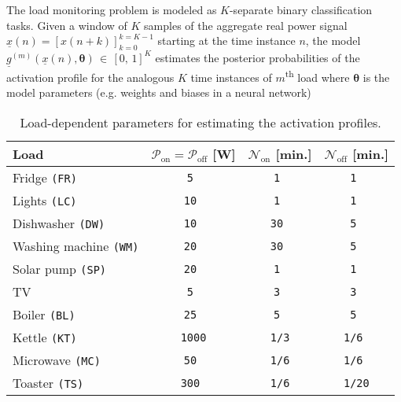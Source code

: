 \documentclass[twocolumn,letter,10pt]{IEEEtran} %
\begin{document}
The load monitoring problem is modeled as $K$-separate binary classification tasks. Given a window of $K$ samples of the aggregate real power signal $\underline{x}(n) = \left[x(n + k)\right]_{k=0}^{k=K-1}$ starting at the time instance $n$, the model $\underline{g}^{(m)}(\underline{x}(n), \bm{\theta})\,\in\,[0,\,1]^K$ estimates the posterior probabilities of the activation profile for the analogous $K$ time instances of $m$\textsuperscript{th} load where $\bm{\theta}$ is the model parameters (e.g. weights and biases in a neural network)

\setlength{\textfloatsep}{0.1cm}
\begin{table}[!t]
	\centering
	\footnotesize
	\caption{Load-dependent parameters for estimating the activation profiles. }
	\label{tbl:loads}
	\renewcommand{\arraystretch}{0.81}
	\footnotesize
	\begin{tabularx}{88mm}{lccc}
		\toprule
		Load  	 & $\mathcal{P}_{\text{on}} = \mathcal{P}_{\text{off}}$ [W] & $\mathcal{N}_{\text{on}}$ [min.]  & $\mathcal{N}_{\text{off}}$ [min.]\\[1mm]
		\midrule{Fridge \texttt{(FR)}}               & \texttt{5   }    & \texttt{1  }    & \texttt{1   }    \\[1mm]
		{Lights \texttt{(LC)}}               & \texttt{10  }    & \texttt{1  }    & \texttt{1   }    \\[1mm]
		{Dishwasher \texttt{(DW)}}           & \texttt{10  }    & \texttt{30 }    & \texttt{5   }    \\[1mm]
		{Washing machine \texttt{(WM)}}      & \texttt{20  }    & \texttt{30 }    & \texttt{5   }    \\[1mm]
		{Solar  pump \texttt{(SP)}}   		& \texttt{20  }    & \texttt{1  }    & \texttt{1   }    \\[1mm]
		{TV}                                 & \texttt{5   }    & \texttt{3  }    & \texttt{3   }    \\[1mm]
		{Boiler \texttt{(BL)}}               & \texttt{25  }    & \texttt{5  }    & \texttt{5   }    \\[1mm]
		{Kettle \texttt{(KT)}}               & \texttt{1000}    & \texttt{1/3}    & \texttt{1/6 }    \\[1mm]
		{Microwave \texttt{(MC)}}            & \texttt{50  }    & \texttt{1/6}    & \texttt{1/6 }    \\[1mm]
		{Toaster \texttt{(TS)}}              & \texttt{300 }    & \texttt{1/6}    & \texttt{1/20}    \\
		\bottomrule
	\end{tabularx}
\end{table}
\end{document}
